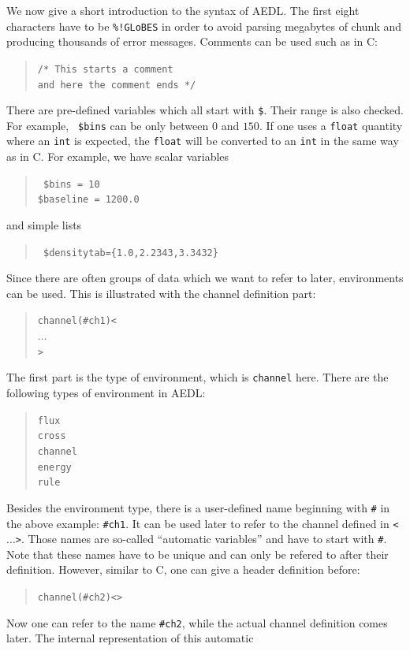 We now give a short introduction to the syntax of AEDL.
 The first eight characters have to be {\tt \%!GLoBES}
in order to avoid parsing megabytes of chunk
 and producing thousands of error messages. 
%
Comments can be used such as in C:
\begin{quote}
{\tt /* This starts a comment\\
 and here the comment ends */
}
\end{quote}
There are pre-defined variables which all start with {\tt \$}. Their range
is also checked. For example,  {\tt 
\$bins} can be only between $0$ and $150$. If one uses a {\tt float} quantity where  an {\tt int} is expected, the {\tt float} will be converted to an {\tt int} in the same way as in C.  For example, we have scalar variables
\begin{quote}
{\tt
\$bins = 10\\
\$baseline = 1200.0
}
\end{quote}
and simple lists
\begin{quote}
{\tt
\$densitytab=\{1.0,2.2343,3.3432\} 
}
\end{quote}
%
Since there are often groups of data which we want to refer to later,
environments can be used. This is illustrated 
with the channel definition part:
\begin{quote}
{\tt channel(\#ch1)<\\
\tb  $\ldots$\\
>
}
\end{quote}
The first part is the type of environment, which is {\tt channel} here. 
There are the following types of environment in AEDL:
\begin{quote}
{\tt flux\\
cross\\
channel\\
energy\\
rule
}
\end{quote}
Besides the environment type, there is a user-defined name 
beginning with {\tt \#}
in the above example: {\tt \#ch1}. It can be used later to refer to the 
channel defined in {\tt <$\ldots$>}. Those names are so-called 
``automatic variables'' and have to start with {\tt \#}. Note that these names have to be unique and can only be refered to after their definition.
However, similar to C, one can give a header definition before:
\begin{quote}
{\tt    channel(\#ch2)<>}
\end{quote}
Now one can refer to the name {\tt \#ch2}, while the actual channel definition comes later. The internal representation of this automatic
